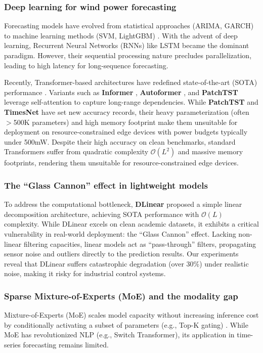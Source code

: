 \documentclass[review,3p,times,draft]{elsarticle}
\begin{document}
\subsubsection{Deep learning for wind power forecasting}
Forecasting models have evolved from statistical approaches (ARIMA, GARCH) \cite{segnon2017modeling,zhu2017forecasting} to machine learning methods (SVM, LightGBM) \cite{lin2022forecasting,yang2023forecasting}. With the advent of deep learning, Recurrent Neural Networks (RNNs) like LSTM \cite{hochreiter1997long} became the dominant paradigm. However, their sequential processing nature precludes parallelization, leading to high latency for long-sequence forecasting.

Recently, Transformer-based architectures have redefined state-of-the-art (SOTA) performance \cite{vaswani2017attention}. Variants such as \textbf{Informer} \cite{zhou2021informer}, \textbf{Autoformer} \cite{wu2021autoformer}, and \textbf{PatchTST} \cite{nie2023patchtst} leverage self-attention to capture long-range dependencies. While \textbf{PatchTST} and \textbf{TimesNet} have set new accuracy records, their heavy parameterization (often $>$500K parameters) and high memory footprint make them unsuitable for deployment on resource-constrained edge devices with power budgets typically under 500mW. Despite their high accuracy on clean benchmarks, standard Transformers suffer from quadratic complexity $\mathcal{O}(L^2)$ and massive memory footprints, rendering them unsuitable for resource-constrained edge devices.

\subsubsection{The ``Glass Cannon'' effect in lightweight models}
To address the computational bottleneck, \textbf{DLinear} \cite{zeng2023dlinear} proposed a simple linear decomposition architecture, achieving SOTA performance with $\mathcal{O}(L)$ complexity. While DLinear excels on clean academic datasets, it exhibits a critical vulnerability in real-world deployment: the ``Glass Cannon'' effect. Lacking non-linear filtering capacities, linear models act as ``pass-through'' filters, propagating sensor noise and outliers directly to the prediction results. Our experiments reveal that DLinear suffers catastrophic degradation (over 30\%) under realistic noise, making it risky for industrial control systems.

\subsubsection{Sparse Mixture-of-Experts (MoE) and the modality gap}
Mixture-of-Experts (MoE) scales model capacity without increasing inference cost by conditionally activating a subset of parameters (e.g., Top-K gating) \cite{shazeer2017outrageously}. While MoE has revolutionized NLP (e.g., Switch Transformer), its application in time-series forecasting remains limited.
\end{document}
